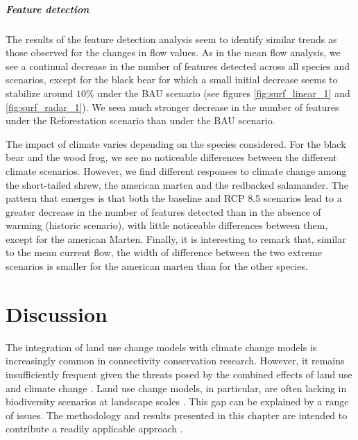 \vspace{1em}

\subparagraph*{\textit{Feature detection}} The results of the feature detection analysis seem to identify similar trends as those observed for the changes in flow values. As in the mean flow analysis, we see a continual decrease in the number of features detected across all species and scenarios, except for the black bear for which a small initial decrease seems to stabilize around $10\%$ under the BAU scenario (see figures \ref{fig:surf_linear_1} and \ref{fig:surf_radar_1}). We seea much stronger decrease in the number of features under the Reforestation scenario than under the BAU scenario.

The impact of climate varies depending on the species considered. For the black bear and the wood frog, we see no noticeable differences between the different climate scenarios. However, we find different responses to climate change among the short-tailed shrew, the american marten and the redbacked salamander. The pattern that emerges is that both the baseline and RCP 8.5 scenarios lead to a greater decrease in the number of features detected than in the absence of warming (historic scenario), with little noticeable differences between them, except for the american Marten. Finally, it is interesting to remark that, similar to the mean  current flow, the width of difference between the two extreme scenarios is smaller for the american marten than for the other species.\\

\section{Discussion}

The integration of land use change models with climate change models is increasingly common in connectivity conservation research. However, it remains insufficiently frequent given the threats posed by the combined effects of land use and climate change \citep{costanza_landscape_2019}. Land use change models, in particular, are often lacking in biodiversity scenarios at landscape scales \citep{titeux_biodiversity_2016}. This gap can be explained by a range of issues. The methodology and results presented in this chapter are intended to contribute a readily applicable approach .

